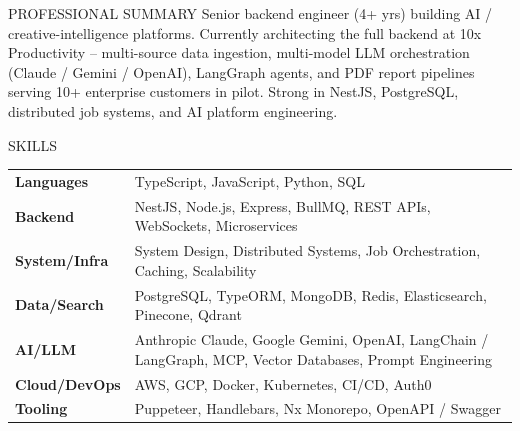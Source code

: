 \documentclass{resume}
\begin{document}
\begin{rSection}{PROFESSIONAL SUMMARY}
Senior backend engineer (4+ yrs) building AI / creative-intelligence platforms. Currently architecting the full backend at 10x Productivity -- multi-source data ingestion, multi-model LLM orchestration (Claude / Gemini / OpenAI), LangGraph agents, and PDF report pipelines serving 10+ enterprise customers in pilot. Strong in NestJS, PostgreSQL, distributed job systems, and AI platform engineering.
\end{rSection}

\begin{rSection}{SKILLS}
\begin{tabular}{ @{} >{\bfseries}l @{\hspace{6ex}} >{\raggedright\arraybackslash}p{} @{} }
Languages & TypeScript, JavaScript, Python, SQL \\
Backend & NestJS, Node.js, Express, BullMQ, REST APIs, WebSockets, Microservices \\
System/Infra & System Design, Distributed Systems, Job Orchestration, Caching, Scalability \\
Data/Search & PostgreSQL, TypeORM, MongoDB, Redis, Elasticsearch, Pinecone, Qdrant \\
AI/LLM & Anthropic Claude, Google Gemini, OpenAI, LangChain / LangGraph, MCP, Vector Databases, Prompt Engineering \\
Cloud/DevOps & AWS, GCP, Docker, Kubernetes, CI/CD, Auth0 \\
Tooling & Puppeteer, Handlebars, Nx Monorepo, OpenAPI / Swagger \\
\end{tabular}
\end{rSection}
\end{document}
